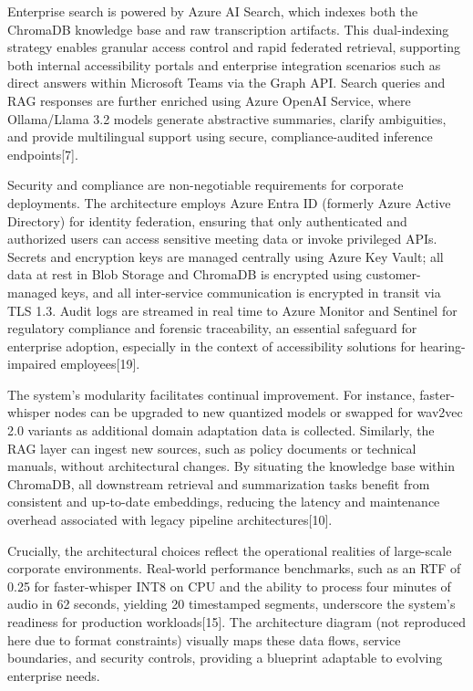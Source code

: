 \documentclass[12pt,a4paper]{article}
\begin{document}
Enterprise search is powered by Azure AI Search, which indexes both the ChromaDB knowledge base and raw transcription artifacts. This dual-indexing strategy enables granular access control and rapid federated retrieval, supporting both internal accessibility portals and enterprise integration scenarios such as direct answers within Microsoft Teams via the Graph API. Search queries and RAG responses are further enriched using Azure OpenAI Service, where Ollama/Llama 3.2 models generate abstractive summaries, clarify ambiguities, and provide multilingual support using secure, compliance-audited inference endpoints[7].


Security and compliance are non-negotiable requirements for corporate deployments. The architecture employs Azure Entra ID (formerly Azure Active Directory) for identity federation, ensuring that only authenticated and authorized users can access sensitive meeting data or invoke privileged APIs. Secrets and encryption keys are managed centrally using Azure Key Vault; all data at rest in Blob Storage and ChromaDB is encrypted using customer-managed keys, and all inter-service communication is encrypted in transit via TLS 1.3. Audit logs are streamed in real time to Azure Monitor and Sentinel for regulatory compliance and forensic traceability, an essential safeguard for enterprise adoption, especially in the context of accessibility solutions for hearing-impaired employees[19].


The system’s modularity facilitates continual improvement. For instance, faster-whisper nodes can be upgraded to new quantized models or swapped for wav2vec 2.0 variants as additional domain adaptation data is collected. Similarly, the RAG layer can ingest new sources, such as policy documents or technical manuals, without architectural changes. By situating the knowledge base within ChromaDB, all downstream retrieval and summarization tasks benefit from consistent and up-to-date embeddings, reducing the latency and maintenance overhead associated with legacy pipeline architectures[10].


Crucially, the architectural choices reflect the operational realities of large-scale corporate environments. Real-world performance benchmarks, such as an RTF of 0.25 for faster-whisper INT8 on CPU and the ability to process four minutes of audio in 62 seconds, yielding 20 timestamped segments, underscore the system’s readiness for production workloads[15]. The architecture diagram (not reproduced here due to format constraints) visually maps these data flows, service boundaries, and security controls, providing a blueprint adaptable to evolving enterprise needs.
\end{document}
